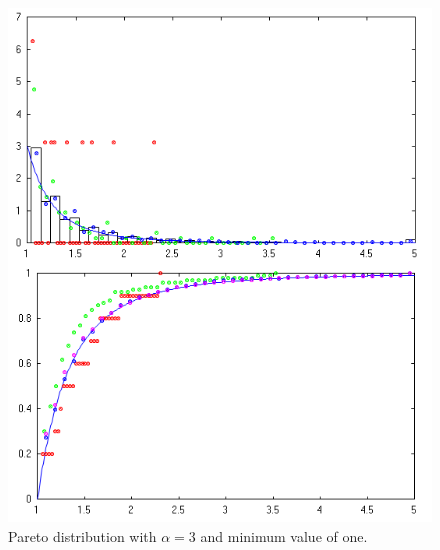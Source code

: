 \documentclass[letterpaper]{article}
\begin{document}
\begin{figure}[ht]
  \centering
  \includegraphics[width=\columnwidth]{2015-11-11_pareto.png}
  \caption{\label{fig:dParet} Pareto distribution with $\alpha=3$ and minimum
    value of one.}
\end{figure}
\end{document}
